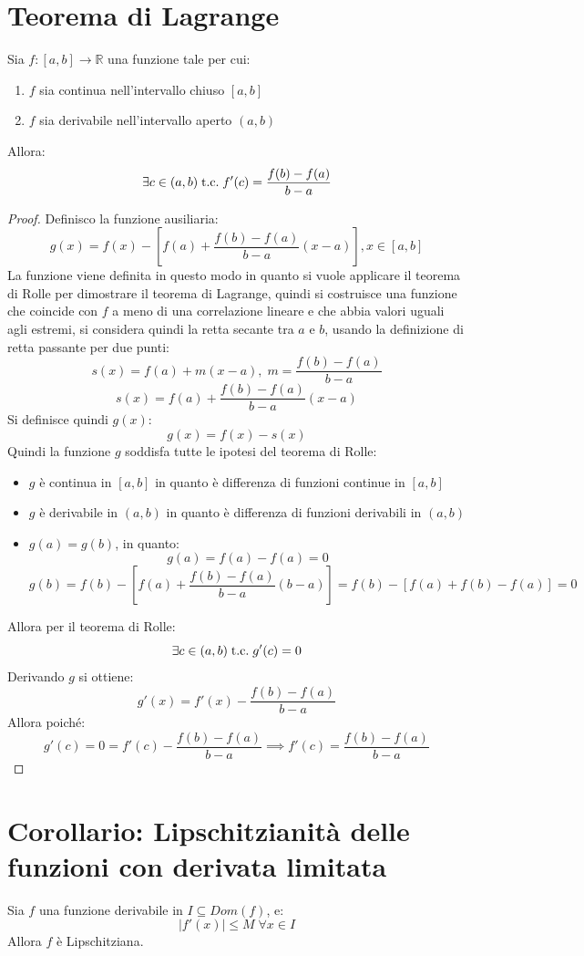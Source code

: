 \documentclass[a4paper,12pt,openright]{book}
\begin{document}
	\section{Teorema di Lagrange}
	Sia $f: [a, b] \longrightarrow \mathbb{R}$ una funzione tale per cui:
	\begin{enumerate}[label=\roman*)]
	\item $f$ sia continua nell'intervallo chiuso $[a, b]$
	\item $f$ sia derivabile nell'intervallo aperto $(a, b)$
	\end{enumerate}
	Allora:
	\[\exists c \in (a, b) \;\text{t.c.}\; f'(c) = \frac{f(b) - f(a)}{b - a}\]
	
	\begin{proof}
		Definisco la funzione ausiliaria:
		\[g(x) = f(x) - [f(a) + \frac{f(b) - f(a)}{b - a}(x - a)], x \in [a, b]\]
		La funzione viene definita in questo modo in quanto si vuole applicare il teorema di Rolle per dimostrare il teorema di Lagrange, quindi si costruisce una funzione che coincide con $f$ a meno di una correlazione lineare e che abbia valori uguali agli estremi, si considera quindi la retta secante tra $a$ e $b$, usando la definizione di retta passante per due punti:
		\[s(x) = f(a) + m(x - a), \; m = \frac{f(b) - f(a)}{b - a}\]
		\[s(x) = f(a) + \frac{f(b) - f(a)}{b - a}(x - a)\]
		Si definisce quindi $g(x)$:
		\[g(x) = f(x) - s(x)\]
		Quindi la funzione $g$ soddisfa tutte le ipotesi del teorema di Rolle:
		\begin{itemize}
			\item $g$ è continua in $[a, b]$ in quanto è differenza di funzioni continue in $[a, b]$
			\item $g$ è derivabile in $(a, b)$ in quanto è differenza di funzioni derivabili in $(a, b)$
			\item $g(a) = g(b)$, in quanto:
			\[g(a) = f(a) - f(a) = 0\]
			\[g(b) = f(b) - [f(a) + \frac{f(b) - f(a)}{b - a}(b - a)] = f(b) - [f(a) + f(b) - f(a)] = 0\]
		\end{itemize}
		Allora per il teorema di Rolle:
		\[\exists c \in (a, b) \;\text{t.c.}\; g'(c) = 0\]
		Derivando $g$ si ottiene:
		\[g'(x) = f'(x) - \frac{f(b) - f(a)}{b - a}\]
		Allora poiché:
		\[g'(c) = 0 = f'(c) - \frac{f(b) - f(a)}{b - a} \implies f'(c) = \frac{f(b) - f(a)}{b - a}\]
	\end{proof}
	
	\section{Corollario: Lipschitzianità delle funzioni con derivata limitata}
	Sia $f$ una funzione derivabile in $I \subseteq Dom(f)$, e:
	\[|f'(x)| \leq M \; \forall x \in I\]
	Allora $f$ è Lipschitziana.
	
\end{document}
